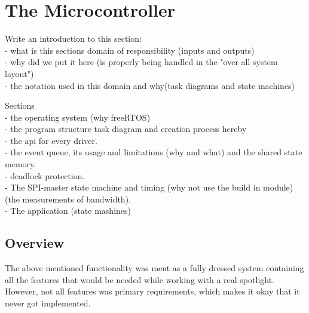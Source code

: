 
\section{The Microcontroller}
\label{sec:TheMicrocontroller}

Write an introduction to this section:\\
- what is this sections domain of responsibility (inputs and outputs)\\
- why did we put it here (is properly being handled in the "over all system layout")\\
- the notation used in this domain and why(task diagrams and state machines)


Sections\\
- the operating system (why freeRTOS)\\
- the program structure task diagram and creation process hereby\\

- the api for every driver. \\
- the event queue, its usage and limitations (why and what) and the shared state memory.\\
- deadlock protection. \\
- The SPI-master state machine and timing (why not use the build in module) (the measurements of bandwidth). \\
- The application (state mashines)

	















\subsection{Overview}
The above mentioned functionality was ment as a fully dressed system containing all the features that would be needed while working with a real spotlight. However, not all features was primary requirements, which makes it okay that it never got implemented. 
 
